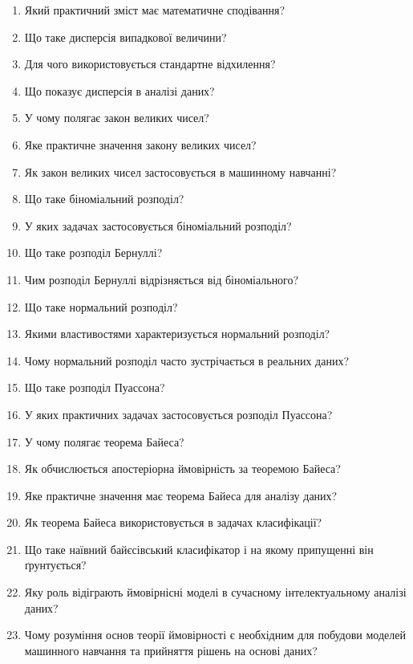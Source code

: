 \begin{enumerate}
\item Який практичний зміст має математичне сподівання?
\item Що таке дисперсія випадкової величини?
\item Для чого використовується стандартне відхилення?
\item Що показує дисперсія в аналізі даних?
\item У чому полягає закон великих чисел?
\item Яке практичне значення закону великих чисел?
\item Як закон великих чисел застосовується в машинному навчанні?
\item Що таке біноміальний розподіл?
\item У яких задачах застосовується біноміальний розподіл?
\item Що таке розподіл Бернуллі?
\item Чим розподіл Бернуллі відрізняється від біноміального?
\item Що таке нормальний розподіл?
\item Якими властивостями характеризується нормальний розподіл?
\item Чому нормальний розподіл часто зустрічається в реальних даних?
\item Що таке розподіл Пуассона?
\item У яких практичних задачах застосовується розподіл Пуассона?
\item У чому полягає теорема Байеса?
\item Як обчислюється апостеріорна ймовірність за теоремою Байеса?
\item Яке практичне значення має теорема Байеса для аналізу даних?
\item Як теорема Байеса використовується в задачах класифікації?
\item Що таке наївний байєсівський класифікатор і на якому припущенні він ґрунтується?
\item Яку роль відіграють ймовірнісні моделі в сучасному інтелектуальному аналізі даних?
\item Чому розуміння основ теорії ймовірності є необхідним для побудови моделей машинного навчання та прийняття рішень на основі даних?
\end{enumerate}
